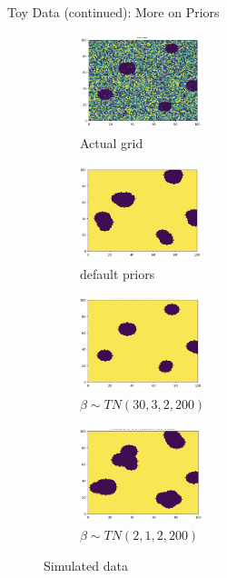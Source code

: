 \documentclass[10pt,mathserif]{beamer}
\begin{document}
\begin{frame}{Toy Data (continued): More on Priors}
\begin{figure}[t!]
    \centering
    \begin{subfigure}[t]{0.3\textwidth}
        \centering
        \includegraphics[height=1.1in, width=1.4in]{../BDC_gridactual}
        \caption{Actual grid}
    \end{subfigure}%
    \begin{subfigure}[t]{0.3\textwidth}
        \centering
        \includegraphics[height=1.1in, width=1.4in]{../BDC_grid1}
        \caption{default priors}
    \end{subfigure} %
    \begin{subfigure}[t]{0.3\textwidth}
        \centering
        \includegraphics[height=1.1in, width=1.4in]{../BDC_grid2_strongsig}
        \caption{ $\beta \sim TN(30, 3, 2, 200)$}
    \end{subfigure}%
        \begin{subfigure}[t]{0.3\textwidth}
        \centering
        \includegraphics[height=1.1in, width=1.4in]{../BDC_grid3_weaksig}
        \caption{ $\beta \sim TN(2, 1, 2, 200)$}
    \end{subfigure}
    \caption{Simulated data}
\end{figure}
\end{frame}
\end{document}
